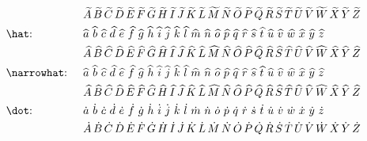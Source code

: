 \documentclass{myassignment}
\begin{document}
\begin{align*}
    &&&\narrowtilde{A}\,\narrowtilde{B}\,\narrowtilde{C}\,\narrowtilde{D}\,\narrowtilde{E}\,\narrowtilde{F}\,\narrowtilde{G}\,\narrowtilde{H}\,\narrowtilde{I}\,\narrowtilde{J}\,\narrowtilde{K}\,\narrowtilde{L}\,\narrowtilde{M}\,\narrowtilde{N}\,\narrowtilde{O}\,\narrowtilde{P}\,\narrowtilde{Q}\,\narrowtilde{R}\,\narrowtilde{S}\,\narrowtilde{T}\,\narrowtilde{U}\,\narrowtilde{V}\,\narrowtilde{W}\,\narrowtilde{X}\,\narrowtilde{Y}\,\narrowtilde{Z} \\
    &\text{\texttt{\textbackslash hat}: } &&\hat{a}\,\,\hat{b}\,\,\hat{c}\,\,\hat{d}\,\,\hat{e}\,\,\hat{f}\,\,\hat{g}\,\,\hat{h}\,\,\hat{i}\,\,\hat{j}\,\,\hat{k}\,\,\hat{l}\,\,\hat{m}\,\,\hat{n}\,\,\hat{o}\,\,\hat{p}\,\,\hat{q}\,\,\hat{r}\,\,\hat{s}\,\,\hat{t}\,\,\hat{u}\,\,\hat{v}\,\,\hat{w}\,\,\hat{x}\,\,\hat{y}\,\,\hat{z} \\
    &&&\hat{A}\,\hat{B}\,\hat{C}\,\hat{D}\,\hat{E}\,\hat{F}\,\hat{G}\,\hat{H}\,\hat{I}\,\hat{J}\,\hat{K}\,\hat{L}\,\hat{M}\,\hat{N}\,\hat{O}\,\hat{P}\,\hat{Q}\,\hat{R}\,\hat{S}\,\hat{T}\,\hat{U}\,\hat{V}\,\hat{W}\,\hat{X}\,\hat{Y}\,\hat{Z} \\
    &\text{\texttt{\textbackslash narrowhat}: } &&\narrowhat{a}\,\,\narrowhat{b}\,\,\narrowhat{c}\,\,\narrowhat{d}\,\,\narrowhat{e}\,\,\narrowhat{f}\,\,\narrowhat{g}\,\,\narrowhat{h}\,\,\narrowhat{i}\,\,\narrowhat{j}\,\,\narrowhat{k}\,\,\narrowhat{l}\,\,\narrowhat{m}\,\,\narrowhat{n}\,\,\narrowhat{o}\,\,\narrowhat{p}\,\,\narrowhat{q}\,\,\narrowhat{r}\,\,\narrowhat{s}\,\,\narrowhat{t}\,\,\narrowhat{u}\,\,\narrowhat{v}\,\,\narrowhat{w}\,\,\narrowhat{x}\,\,\narrowhat{y}\,\,\narrowhat{z} \\
    &&&\narrowhat{A}\,\narrowhat{B}\,\narrowhat{C}\,\narrowhat{D}\,\narrowhat{E}\,\narrowhat{F}\,\narrowhat{G}\,\narrowhat{H}\,\narrowhat{I}\,\narrowhat{J}\,\narrowhat{K}\,\narrowhat{L}\,\narrowhat{M}\,\narrowhat{N}\,\narrowhat{O}\,\narrowhat{P}\,\narrowhat{Q}\,\narrowhat{R}\,\narrowhat{S}\,\narrowhat{T}\,\narrowhat{U}\,\narrowhat{V}\,\narrowhat{W}\,\narrowhat{X}\,\narrowhat{Y}\,\narrowhat{Z} \\
    &\text{\texttt{\textbackslash dot}: } &&\dot{a}\,\,\dot{b}\,\,\dot{c}\,\,\dot{d}\,\,\dot{e}\,\,\dot{f}\,\,\dot{g}\,\,\dot{h}\,\,\dot{i}\,\,\dot{j}\,\,\dot{k}\,\,\dot{l}\,\,\dot{m}\,\,\dot{n}\,\,\dot{o}\,\,\dot{p}\,\,\dot{q}\,\,\dot{r}\,\,\dot{s}\,\,\dot{t}\,\,\dot{u}\,\,\dot{v}\,\,\dot{w}\,\,\dot{x}\,\,\dot{y}\,\,\dot{z} \\
    &&&\dot{A}\,\dot{B}\,\dot{C}\,\dot{D}\,\dot{E}\,\dot{F}\,\dot{G}\,\dot{H}\,\dot{I}\,\dot{J}\,\dot{K}\,\dot{L}\,\dot{M}\,\dot{N}\,\dot{O}\,\dot{P}\,\dot{Q}\,\dot{R}\,\dot{S}\,\dot{T}\,\dot{U}\,\dot{V}\,\dot{W}\,\dot{X}\,\dot{Y}\,\dot{Z} \\

\end{align*}
\end{document}
